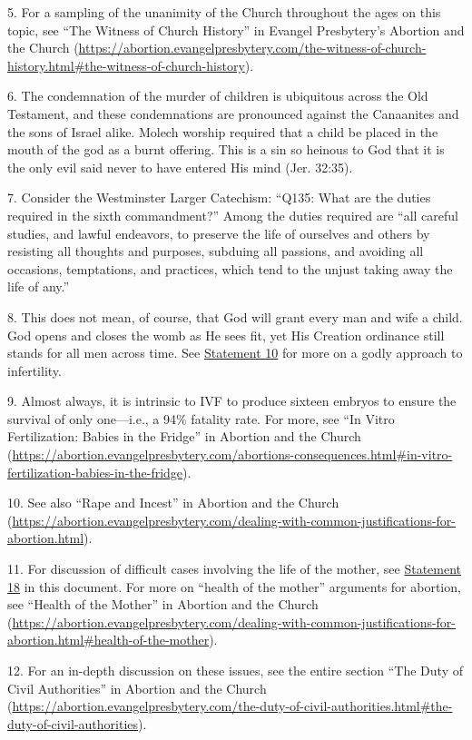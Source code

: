 \documentclass[
]{book}
\begin{document}
5. For a sampling of the unanimity of the Church throughout the ages on this topic, see ``The Witness of Church History'' in
Evangel Presbytery's Abortion and the Church (\url{https://abortion.evangelpresbytery.com/the-witness-of-church-history.html\#the-witness-of-church-history}).

6. The condemnation of the murder of children is ubiquitous across the Old Testament, and these condemnations are pronounced against the Canaanites and the sons of Israel alike. Molech worship required that a child be placed in the mouth of the god as a burnt offering. This is a sin so heinous to God that it is the only evil said never to have entered His mind (Jer. 32:35).

7. Consider the Westminster Larger Catechism: ``Q135: What are the duties required in the sixth commandment?'' Among the duties required are ``all careful studies, and lawful endeavors, to preserve the life of ourselves and others by resisting all thoughts and purposes, subduing all passions, and avoiding all occasions, temptations, and practices, which tend to the unjust taking away the life of any.''

8. This does not mean, of course, that God will grant every man and wife a child. God opens and closes the womb as He sees fit, yet His Creation ordinance still stands for all men across time. See \protect\hyperlink{statement-10}{Statement 10} for more on a godly approach to infertility.

9. Almost always, it is intrinsic to IVF to produce sixteen embryos to ensure the survival of only one---i.e., a 94\% fatality rate. For more, see ``In Vitro Fertilization: Babies in the Fridge'' in Abortion and the Church (\url{https://abortion.evangelpresbytery.com/abortions-consequences.html\#in-vitro-fertilization-babies-in-the-fridge}).

10. See also ``Rape and Incest'' in Abortion and the Church (\url{https://abortion.evangelpresbytery.com/dealing-with-common-justifications-for-abortion.html}).

11. For discussion of difficult cases involving the life of the mother, see \protect\hyperlink{statement-18}{Statement 18} in this document. For more on ``health of the mother'' arguments for abortion, see ``Health of the Mother'' in Abortion and the Church (\url{https://abortion.evangelpresbytery.com/dealing-with-common-justifications-for-abortion.html\#health-of-the-mother}).

12. For an in-depth discussion on these issues, see the entire section ``The Duty of Civil Authorities'' in Abortion and the Church (\url{https://abortion.evangelpresbytery.com/the-duty-of-civil-authorities.html\#the-duty-of-civil-authorities}).
\end{document}
